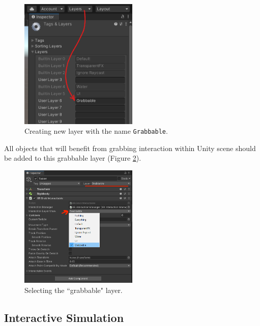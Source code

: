 \begin{figure}[!ht]
	\centering
	\includegraphics[width=0.5\textwidth]{figures/edit-layers.png}
	\caption{Creating new layer with the name \texttt{Grabbable}.}
	\label{fig:grabbable-layer}
\end{figure}

All objects that will benefit from grabbing interaction within Unity scene should be added to this grabbable layer (Figure \ref{fig:grabbable-layer-selection}).

\begin{figure}[!ht]
	\centering
	\includegraphics[width=0.5\textwidth]{figures/grabbable-layer.png}
	\caption{Selecting the ``grabbable" layer.}
	\label{fig:grabbable-layer-selection}
\end{figure}



\subsection{Interactive Simulation}\label{sec:interactive-simulation}

